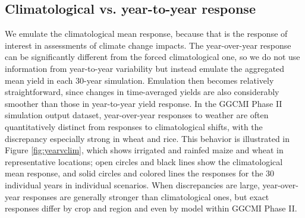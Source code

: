 \documentclass[gmd, manuscript]{copernicus} %
\begin{document}


\subsection{Climatological vs. year-to-year response}

We emulate the climatological mean response, because that is the response of interest in assessments of climate change impacts. 
The year-over-year response can be significantly different from the forced climatological one, so we do not use information from year-to-year variability but instead emulate the aggregated mean yield in each 30-year simulation. 
Emulation then becomes relatively straightforward, since changes in time-averaged yields are also considerably smoother than those in year-to-year yield response.
In the GGCMI Phase II simulation output dataset, year-over-year responses to weather are often quantitatively distinct from responses to climatological shifts, with the discrepancy especially strong in wheat and rice. 
This behavior is illustrated in Figure \ref{fig:yearvclim}, which shows irrigated and rainfed maize and wheat in representative locations; open circles and black lines show the climatological mean response, and solid circles and colored lines the responses for the 30 individual years in individual scenarios.  
When discrepancies are large, year-over-year responses are generally stronger than climatological ones, but exact responses differ by crop and region and even by model within GGCMI Phase II. 
\end{document}
